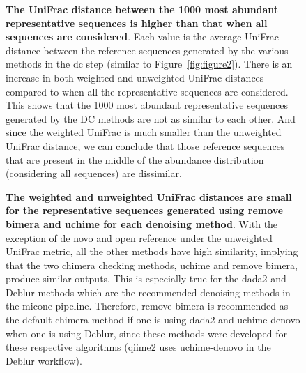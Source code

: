 \documentclass[letterpaper,12pt]{article}
\begin{document}
    \begin{figure}[H]
      \centering
        \caption{
          \textbf{The UniFrac distance between the 1000 most abundant representative sequences is higher than that when all sequences are considered}.
          Each value is the average UniFrac distance between the reference sequences generated by the various methods in the \ac{dc} step (similar to Figure~\ref{fig:figure2}).
          There is an increase in both weighted and unweighted UniFrac distances compared to when all the representative sequences are considered.
          This shows that the 1000 most abundant representative sequences generated by the DC methods are not as similar to each other.
          And since the weighted UniFrac is much smaller than the unweighted UniFrac distance, we can conclude that those reference sequences that are present in the middle of the abundance distribution (considering all sequences) are dissimilar.
        }
      \label{fig:figure_s2}
    \end{figure}

    \begin{figure}[H]
      \centering
        \caption{
          \textbf{The weighted and unweighted UniFrac distances are small for the representative sequences generated using remove bimera and uchime for each denoising method}.
          With the exception of de novo and open reference under the unweighted UniFrac metric, all the other methods have high similarity, implying that the two chimera checking methods, uchime and remove bimera, produce similar outputs.
          This is especially true for the \ac{dada2} and Deblur methods which are the recommended denoising methods in the \ac{micone} pipeline.
          Therefore, remove bimera is recommended as the default chimera method if one is using \ac{dada2} and uchime-denovo when one is using Deblur, since these methods were developed for these respective algorithms (\ac{qiime2} uses uchime-denovo in the Deblur workflow).
        }
      \label{fig:figure_s3}
    \end{figure}
\end{document}
